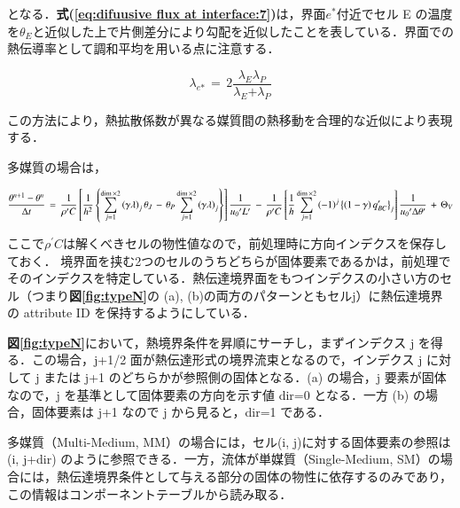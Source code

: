となる．\textbf{式(\ref{eq:difuusive flux at interface:7})}は，界面$e^{*}$付近でセル E の温度を$\theta_{E}$と近似した上で片側差分により勾配を近似したことを表している．界面での熱伝導率として調和平均を用いる点に注意する．

\begin{equation}
{{\mathit{\lambda}}_{e\mathrm{*}}} \,=\, {2}\frac{{{\mathit{\lambda}}_{E}}{{\mathit{\lambda}}_{P}}}{{{\mathit{\lambda}}_{E}}\mathrm{{+}}{{\mathit{\lambda}}_{P}}}
\label{eq:difuusive flux at interface:8}
\end{equation}

この方法により，熱拡散係数が異なる媒質間の熱移動を合理的な近似により表現する．

多媒質の場合は，

\begin{equation}
\frac{\theta^{n+1} - \theta^{n}} {\Delta t}
\,=\,
\frac{1}{\rho^{\prime}C} \left[{
\frac{1}{h^{2}} \left\{{
\sum\limits_{j=1}^{\dim\times2} {\left({
\gamma \lambda
}\right)}_{j} \hspace{0.15em}
\theta_{J} \hspace{0.15em}-\hspace{0.15em} \theta_{P} \sum\limits_{j=1}^{\dim\times2}
{\left({
\gamma \lambda
}\right)}_{j}
}\right\}
}\right]
\frac{1}{{u_{\mathit{0}}}^{\prime} L^{\prime}}
\,-\,
\frac{1}{\rho^{\prime}C} \left[{
\frac{1}{h} \sum\limits_{j=1}^{\dim\times2} {
\left({ {-1} }\right)}^{j} \hspace{0.15em}
{\left\{{ 
\left({ {1} - \gamma }\right) q_{BC}^{\prime} 
}\right\}}_{j} 
}\right]
\frac{1}{{u_{\mathit{0}}}^{\prime} \Delta \theta^{\prime}} \,+\, \Theta_{V}
\label{eq:pscalar semi-discrete9}
\end{equation}


ここで$\rho^{\prime}C$は解くべきセルの物性値なので，前処理時に方向インデクスを保存しておく．
境界面を挟む2つのセルのうちどちらが固体要素であるかは，前処理でそのインデクスを特定している．熱伝達境界面をもつインデクスの小さい方のセル（つまり\textbf{図\ref{fig:typeN}}の (a), (b)の両方のパターンともセルj）に熱伝達境界の attribute ID を保持するようにしている．

\textbf{図\ref{fig:typeN}}において，熱境界条件を昇順にサーチし，まずインデクス j を得る．この場合，j+1/2 面が熱伝達形式の境界流束となるので，インデクス j に対して j または j+1 のどちらかが参照側の固体となる．(a) の場合，j 要素が固体なので，j を基準として固体要素の方向を示す値 dir=0 となる．一方 (b) の場合，固体要素は j+1 なので j から見ると，dir=1 である．

多媒質（Multi-Medium, MM）の場合には，セル(i, j)に対する固体要素の参照は (i, j+dir) のように参照できる．一方，流体が単媒質（Single-Medium, SM）の場合には，熱伝達境界条件として与える部分の固体の物性に依存するのみであり，この情報はコンポーネントテーブルから読み取る．
